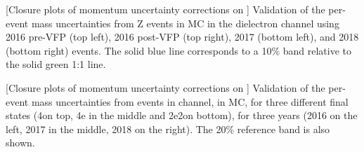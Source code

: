 \begin{multiFigure}
    \centering
        [Closure plots of momentum uncertainty corrections on \ztoee]
        {Validation of the per-event mass uncertainties from Z events in MC in the dielectron channel using 2016 pre-VFP (top left), 2016 post-VFP (top right), 2017 (bottom left), and 2018 (bottom right) events.
		The solid blue line corresponds to a 10\% band relative to the solid green 1:1 line.}
    \label{fig:ZClosure_test_ELE}
\end{multiFigure}
\begin{multiFigure}
    \centering


        [Closure plots of momentum uncertainty corrections on \gghtofourl]
        {Validation of the per-event mass uncertainties from events in \gghtofourl channel, in MC, 
		for three different final states (4\Pmu on top, 4e in the middle and 2e2\Pmu on bottom), 
		for three years (2016 on the left, 2017 in the middle, 2018 on the right).
		The 20\% reference band is also shown.}
    \label{fig:HClosure_test}
\end{multiFigure}
